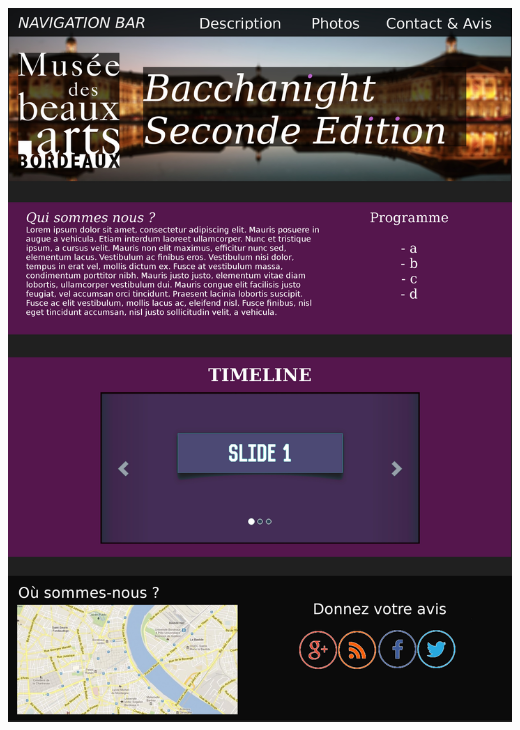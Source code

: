 \documentclass[11pt]{report}
\begin{document}
\vspace{0.4cm}
\includegraphics[scale=0.75]{maquette.jpg}
\end{document}
